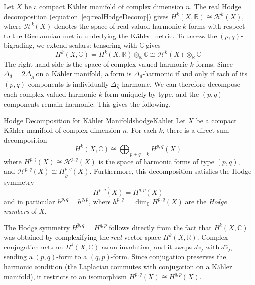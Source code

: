 \documentclass{article}
\newcommand{\C}{\mathbb{C}}
\newcommand{\R}{\mathbb{R}}
\newcommand{\CH}{\mathcal{H}}
\begin{document}
Let $X$ be a compact K\"{a}hler manifold of complex dimension $n$. The real
Hodge decomposition (equation~\eqref{eq:realHodgeDecomp}) gives $H^k(X, \R) \cong
\CH^k(X)$, where $\CH^k(X)$ denotes the space of real-valued harmonic
$k$-forms with respect to the Riemannian metric underlying the K\"{a}hler
metric. To access the $(p,q)$-bigrading, we extend scalars: tensoring with
$\C$ gives
\[
  H^k(X, \C) = H^k(X, \R) \otimes_\R \C \cong \CH^k(X) \otimes_\R \C
\]
The right-hand side is the space of complex-valued harmonic $k$-forms. Since
$\Delta_d = 2\Delta_{\bar\partial}$ on a K\"{a}hler manifold, a form is
$\Delta_d$-harmonic if and only if each of its $(p,q)$-components is
individually $\Delta_{\bar\partial}$-harmonic. We can therefore decompose
each complex-valued harmonic $k$-form uniquely by type, and the
$(p,q)$-components remain harmonic. This gives the following.

\begin{thm}{Hodge Decomposition for K\"{a}hler Manifolds}{hodgeKahler}
  Let $X$ be a compact K\"{a}hler manifold of complex dimension $n$. For each
  $k$, there is a direct sum decomposition
  \[
    H^k(X, \C) \cong \bigoplus_{p+q=k} H^{p,q}(X)
  \]
  where $H^{p,q}(X) \cong \CH^{p,q}(X)$ is the space of harmonic forms of
  type $(p,q)$, and $\CH^{p,q}(X) \cong H^{p,q}_{\bar\partial}(X)$.
  Furthermore, this decomposition satisfies the Hodge symmetry
  \[
    \overline{H^{p,q}(X)} = H^{q,p}(X)
  \]
  and in particular $h^{p,q} = h^{q,p}$, where $h^{p,q} = \dim_\C H^{p,q}(X)$
  are the \emph{Hodge numbers} of $X$.
\end{thm}

The Hodge symmetry $\overline{H^{p,q}} = H^{q,p}$ follows directly from the
fact that $H^k(X, \C)$ was obtained by complexifying the \emph{real} vector
space $H^k(X, \R)$. Complex conjugation acts on $H^k(X, \C)$ as an
involution, and it swaps $dz_j$ with $d\bar{z}_j$, sending a $(p,q)$-form to
a $(q,p)$-form. Since conjugation preserves the harmonic condition (the
Laplacian commutes with conjugation on a K\"{a}hler manifold), it restricts to
an isomorphism $H^{p,q}(X) \cong \overline{H^{q,p}(X)}$.
\end{document}
